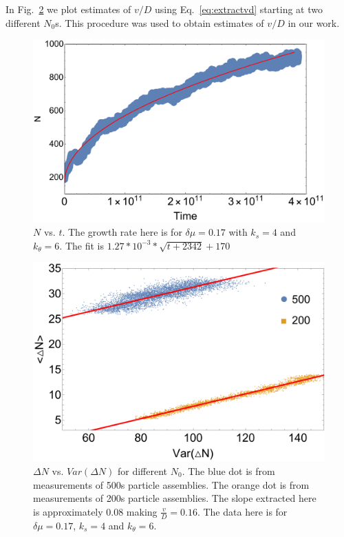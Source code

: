 \documentclass[amsmath,preprintnumbers,10pt,nofootinbib,prl,twocolumn]{revtex4-1}
\begin{document}
In Fig.~\ref{fig:growthvsvariance} we plot estimates of $v/D$ using Eq.~\ref{eq:extractvd} starting at two different $N_0$s. This procedure was used to obtain estimates of $v/D$ in our work. 
\begin{figure}
\centering
\includegraphics[scale=0.3]{Fig2.pdf}
\caption{$N$ vs. $t$. The growth rate here is for $\delta \mu = 0.17$ with $k_s=4$ and $k_\theta = 6$. The fit is $1.27*10^{-3}*\sqrt{t+2342}+170$}\label{fig:GrowthRate}
\end{figure}
\begin{figure}[tbp]
\centering
\includegraphics[scale=0.4]{Fig3.pdf}
\caption{$\Delta N$ vs. $Var(\Delta N)$ for different $N_0$. The blue dot is from measurements of 500s particle assemblies. The orange dot is from measurements of 200s particle assemblies. The slope extracted here is approximately 0.08 making $\frac{v}{D}=0.16$. The data here is for $\delta\mu=0.17$, $k_s=4$ and $k_\theta = 6$.} \label{fig:growthvsvariance}
\end{figure}
\end{document}
